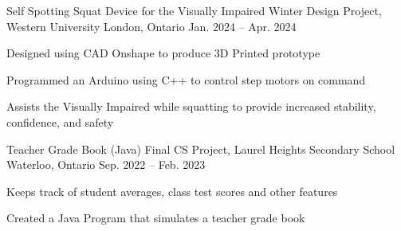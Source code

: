 

\begin{cventries}

  \cventry
    {Self Spotting Squat Device for the Visually Impaired} %
    {Winter Design Project, Western University} %
    {London, Ontario} %
    {Jan. 2024 -- Apr. 2024} %
    {
      \begin{cvitems} %
        \item {Designed using CAD Onshape to produce 3D Printed prototype}
        \item {Programmed an Arduino using C++ to control step motors on command}
        \item {Assists the Visually Impaired while squatting to provide increased stability, confidence, and safety}
      \end{cvitems}
    }

  \cventry
    {Teacher Grade Book (Java)} %
    {Final CS Project, Laurel Heights Secondary School} %
    {Waterloo, Ontario} %
    {Sep. 2022 -- Feb. 2023} %
    {
      \begin{cvitems} %
        \item {Keeps track of student averages, class test scores and other features}
        \item {Created a Java Program that simulates a teacher grade book}
      \end{cvitems}
    }
    \vspace{4mm}

  \vspace{-\baselineskip}


\end{cventries}
